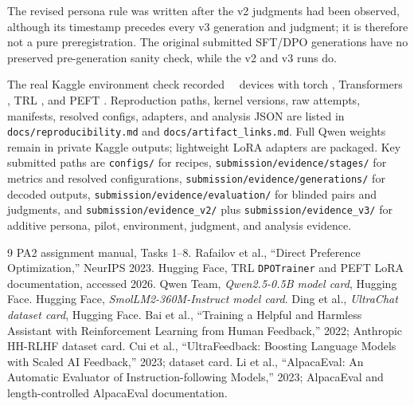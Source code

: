 \documentclass[10pt,a4paper]{article}
\begin{document}
The revised persona rule was written after the v2 judgments had been observed, although its timestamp precedes every v3 generation and judgment; it is therefore not a pure preregistration. The original submitted SFT/DPO generations have no preserved pre-generation sanity check, while the v2 and v3 runs do.

The real Kaggle environment check recorded \GPUCount\ \GPUName\ devices with torch \TorchVersion, Transformers \TransformersVersion, TRL \TRLVersion, and PEFT \PEFTVersion. Reproduction paths, kernel versions, raw attempts, manifests, resolved configs, adapters, and analysis JSON are listed in \texttt{docs/reproducibility.md} and \texttt{docs/artifact\_links.md}. Full Qwen weights remain in private Kaggle outputs; lightweight LoRA adapters are packaged.
Key submitted paths are \texttt{configs/} for recipes, \texttt{submission/evidence/stages/} for metrics and resolved configurations, \texttt{submission/evidence/generations/} for decoded outputs, \texttt{submission/evidence/evaluation/} for blinded pairs and judgments, and \texttt{submission/evidence\_v2/} plus \texttt{submission/evidence\_v3/} for additive persona, pilot, environment, judgment, and analysis evidence.

\begin{thebibliography}{9}\scriptsize\setlength{\itemsep}{-1pt}\setlength{\parskip}{0pt}
 PA2 assignment manual, Tasks 1--8.
 Rafailov et al., ``Direct Preference Optimization,'' NeurIPS 2023.
 Hugging Face, TRL \texttt{DPOTrainer} and PEFT LoRA documentation, accessed 2026.
 Qwen Team, \emph{Qwen2.5-0.5B model card}, Hugging Face.
 Hugging Face, \emph{SmolLM2-360M-Instruct model card}.
 Ding et al., \emph{UltraChat dataset card}, Hugging Face.
 Bai et al., ``Training a Helpful and Harmless Assistant with Reinforcement Learning from Human Feedback,'' 2022; Anthropic HH-RLHF dataset card.
 Cui et al., ``UltraFeedback: Boosting Language Models with Scaled AI Feedback,'' 2023; dataset card.
 Li et al., ``AlpacaEval: An Automatic Evaluator of Instruction-following Models,'' 2023; AlpacaEval and length-controlled AlpacaEval documentation.
\end{thebibliography}
\end{document}
